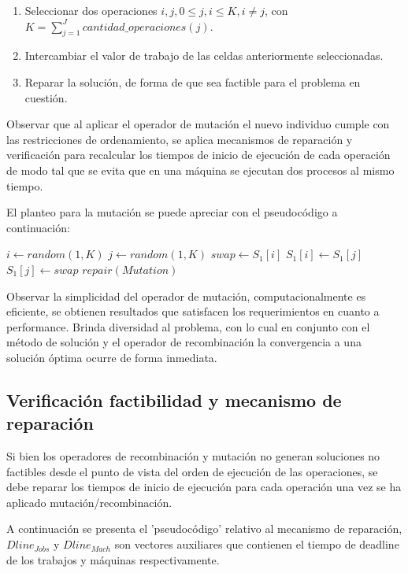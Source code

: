\documentclass[journal]{IEEEtran}
\begin{document}
\begin{enumerate}
  \item Seleccionar dos operaciones $i,j , 0 \leq j,i \leq K, i\neq j$, con $K=\sum_{j=1}^{J}cantidad\_operaciones(j)$.
  \item Intercambiar el valor de trabajo de las celdas anteriormente seleccionadas.
  \item Reparar la solución, de forma de que sea factible para el problema en cuestión.
\end{enumerate}

Observar que al aplicar el operador de mutación el nuevo individuo cumple con las restricciones de ordenamiento, se aplica mecanismos de reparación y verificación para recalcular los tiempos de inicio de ejecución de cada operación de modo tal que se evita que en una máquina se ejecutan dos procesos al mismo tiempo.

El planteo para la mutación se puede apreciar con el pseudocódigo a continuación:
\\

\begin{algorithmic}
  \State $i \gets random(1,K)$
  \State $j \gets random(1,K)$
  \State $swap \gets S_1[i]$
  \State $S_1[i] \gets S_1[j]$
  \State $S_1[j] \gets swap$
  \State $repair(Mutation)$
\end{algorithmic}

Observar la simplicidad del operador de mutación, computacionalmente es eficiente, se obtienen resultados que satisfacen los requerimientos en cuanto a performance. Brinda diversidad al problema, con lo cual en conjunto con el método de solución y el operador de recombinación la convergencia a una solución óptima ocurre de forma inmediata.

\subsection{Verificación factibilidad y mecanismo de reparación}
\label{sec:verif-fact}
Si bien los operadores de recombinación y mutación no generan soluciones no factibles desde el punto de vista del orden de ejecución de las operaciones, se debe reparar los tiempos de inicio de ejecución para cada operación una vez se ha aplicado mutación/recombinación. 

A continuación se presenta el 'pseudocódigo' relativo al mecanismo de reparación, $Dline_{Jobs}$ y $Dline_{Mach}$ son vectores auxiliares que contienen el tiempo de deadline de los trabajos y máquinas respectivamente.
\\
\end{document}
